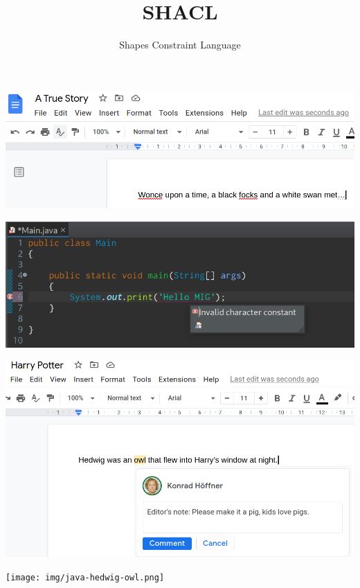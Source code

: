 \documentclass[14pt,aspectratio=1610]{beamer}
\title{SHACL}
\subtitle{Shapes Constraint Language}
\begin{document}
\begin{frame}
\titlepage
\end{frame}

\begin{frame}{}
\centering\includegraphics[width=1.05\textwidth,height=1.05\textheight,keepaspectratio]{img/spelling.png}
\end{frame}

\begin{frame}{}
\centering\includegraphics[width=1.05\textwidth,height=1.05\textheight,keepaspectratio]{img/javaerror.png}
\end{frame}

\begin{frame}{}
\centering\includegraphics[width=1.05\textwidth,height=1.05\textheight,keepaspectratio]{img/hedwig.png}
\end{frame}

\begin{frame}{}
\centering\texttt{[image: img/java-hedwig-owl.png]}
\end{frame}
\end{document}
